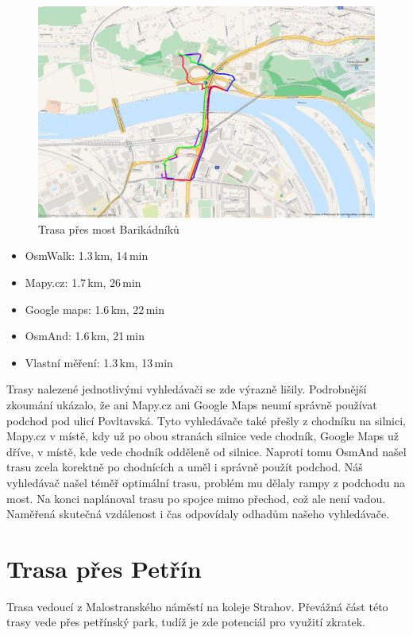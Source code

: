 \begin{figure}[h]
	\centering
	\includegraphics[width=12cm]{../img/kol-hol.png}
	\caption{Trasa přes most Barikádníků}
	\label{fig:kol-hol}
\end{figure}

\begin{itemize}
	\item OsmWalk: 1.3\,km, 14\,min
	\item Mapy.cz: 1.7\,km, 26\,min
	\item Google maps: 1.6\,km, 22\,min
	\item OsmAnd: 1.6\,km, 21\,min
	\item Vlastní měření: 1.3\,km, 13\,min
\end{itemize}
Trasy nalezené jednotlivými vyhledávači se zde výrazně lišily. Podrobnější
zkoumání ukázalo, že ani Mapy.cz ani Google Maps neumí správně používat podchod
pod ulicí Povltavská. Tyto vyhledávače také přešly z chodníku na silnici,
Mapy.cz v místě, kdy už po obou stranách silnice vede chodník, Google Maps už
dříve, v místě, kde vede chodník odděleně od silnice. Naproti tomu OsmAnd našel
trasu zcela korektně po chodnících a uměl i správně použít podchod. Náš
vyhledávač našel téměř optimální trasu, problém mu dělaly rampy z podchodu na
most. Na konci naplánoval trasu po spojce mimo přechod, což ale není vadou.
Naměřená skutečná vzdálenost i čas odpovídaly odhadům našeho vyhledávače.

\section{Trasa přes Petřín}
Trasa vedoucí z Malostranského náměstí na koleje Strahov. Převážná část této
trasy vede přes petřínský park, tudíž je zde potenciál pro využití zkratek. 

